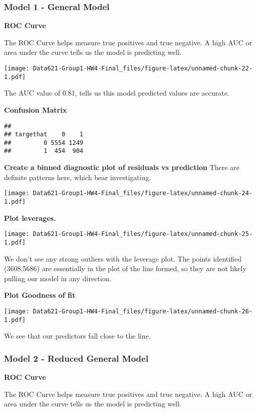 \documentclass[]{article}
\begin{document}
\hypertarget{model-1---general-model}{%
\subsubsection{Model 1 - General Model}\label{model-1---general-model}}

\textbf{ROC Curve}

The ROC Curve helps measure true positives and true negative. A high AUC
or area under the curve tells us the model is predicting well.

\texttt{[image: Data621-Group1-HW4-Final\_files/figure-latex/unnamed-chunk-22-1.pdf]}

The AUC value of 0.81, tells us this model predicted values are
accurate.

\textbf{Confusion Matrix}

\begin{verbatim}
##          
## targethat    0    1
##         0 5554 1249
##         1  454  904
\end{verbatim}

\textbf{Create a binned diagnostic plot of residuals vs prediction}
There are definite patterns here, which bear investigating.

\texttt{[image: Data621-Group1-HW4-Final\_files/figure-latex/unnamed-chunk-24-1.pdf]}

\textbf{Plot leverages.}

\texttt{[image: Data621-Group1-HW4-Final\_files/figure-latex/unnamed-chunk-25-1.pdf]}

We don't see any strong outliers with the leverage plot. The points
identified (3608,5686) are essentially in the plot of the line formed,
so they are not likely pulling our model in any direction.

\textbf{Plot Goodness of fit}

\texttt{[image: Data621-Group1-HW4-Final\_files/figure-latex/unnamed-chunk-26-1.pdf]}

We see that our predictors fall close to the line.

\hypertarget{model-2---reduced-general-model}{%
\subsubsection{Model 2 - Reduced General
Model}\label{model-2---reduced-general-model}}

\textbf{ROC Curve}

The ROC Curve helps measure true positives and true negative. A high AUC
or area under the curve tells us the model is predicting well.
\end{document}
